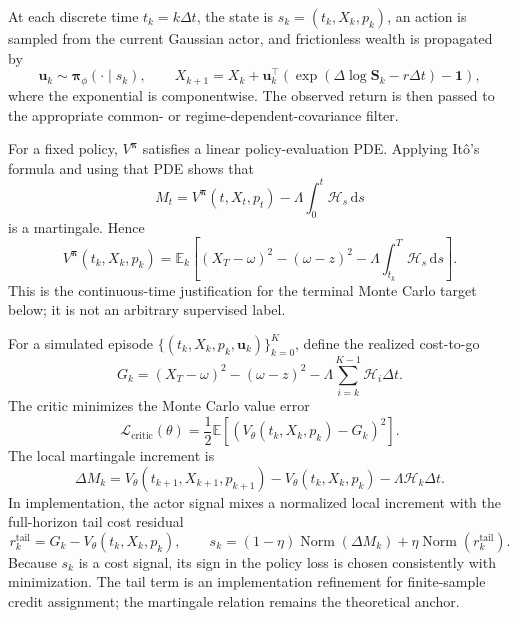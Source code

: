 \documentclass[a4paper,10pt]{article}
\newcommand{\E}{\mathbb{E}}
\newcommand{\dd}{\mathrm{d}}
\newcommand{\bpi}{\bm{\pi}}
\newcommand{\bu}{\bm{u}}
\newcommand{\bone}{\bm{1}}
\newcommand{\bS}{\bm{S}}
\newcommand{\cH}{\mathcal{H}}
\begin{document}
At each discrete time $t_k=k\Delta t$, the state is $s_k=(t_k,X_k,p_k)$, an action is sampled from the current Gaussian actor, and frictionless wealth is propagated by
\begin{equation}
\bu_k\sim\bpi_\phi(\cdot\mid s_k),
\qquad
X_{k+1}=X_k+\bu_k^\top\left(\exp(\Delta\log\bS_k-r\Delta t)-\bone\right),
\label{eq:stage1_discrete_wealth}
\end{equation}
where the exponential is componentwise. The observed return is then passed to the appropriate common- or regime-dependent-covariance filter.

For a fixed policy, $V^{\bpi}$ satisfies a linear policy-evaluation PDE. Applying It\^{o}'s formula and using that PDE shows that
\begin{equation}
M_t=V^{\bpi}(t,X_t,p_t)-\Lambda\int_0^t\cH_s\,\dd s
\label{eq:martingale_process}
\end{equation}
is a martingale. Hence
\begin{equation}
V^{\bpi}(t_k,X_k,p_k)
=\E_k\left[(X_T-\omega)^2-(\omega-z)^2
-\Lambda\int_{t_k}^T\cH_s\,\dd s\right].
\end{equation}
This is the continuous-time justification for the terminal Monte Carlo target below; it is not an arbitrary supervised label.

For a simulated episode $\{(t_k,X_k,p_k,\bu_k)\}_{k=0}^{K}$, define the realized cost-to-go
\begin{equation}
G_k=(X_T-\omega)^2-(\omega-z)^2
-\Lambda\sum_{i=k}^{K-1}\cH_i\Delta t.
\label{eq:cost_to_go}
\end{equation}
The critic minimizes the Monte Carlo value error
\begin{equation}
\mathcal L_{\mathrm{critic}}(\theta)
=\frac12\E[(V_\theta(t_k,X_k,p_k)-G_k)^2].
\end{equation}
The local martingale increment is
\begin{equation}
\Delta M_k
=V_\theta(t_{k+1},X_{k+1},p_{k+1})
-V_\theta(t_k,X_k,p_k)-\Lambda\cH_k\Delta t.
\end{equation}
In implementation, the actor signal mixes a normalized local increment with the full-horizon tail cost residual
\begin{equation}
r_k^{\mathrm{tail}}=G_k-V_\theta(t_k,X_k,p_k),
\qquad
s_k=(1-\eta)\operatorname{Norm}(\Delta M_k)
+\eta\operatorname{Norm}(r_k^{\mathrm{tail}}).
\label{eq:mixed_signal}
\end{equation}
Because $s_k$ is a cost signal, its sign in the policy loss is chosen consistently with minimization. The tail term is an implementation refinement for finite-sample credit assignment; the martingale relation remains the theoretical anchor.
\end{document}

